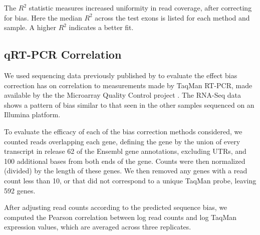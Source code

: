 \documentclass{bioinfo}
\begin{document}
\begin{table}
{
    The $R^2$ statistic measures increased uniformity in read coverage, after
    correcting for bias.  Here the median $R^2$ across the test exons is listed
    for each method and sample. A higher $R^2$ indicates a better fit.
}
\end{table}


\subsection{qRT-PCR Correlation}

We used sequencing data previously published by \citet{Au2010} to evaluate the
effect bias correction has on correlation to measurements made by TaqMan RT-PCR,
made available by the the Microarray Quality Control project \cite{Shi2006}. The
RNA-Seq data shows a pattern of bias similar to that seen in the other samples
sequenced on an Illumina platform.

To evaluate the efficacy of each of the bias correction methods considered, we
counted reads overlapping each gene, defining the gene by the union of every
transcript in release 62 of the Ensembl gene annotations, excluding UTRs, and
100 additional bases from both ends of the gene. Counts were then normalized
(divided) by the length of these genes. We then removed any genes with a read
count less than 10, or that did not correspond to a unique TaqMan probe, leaving
592 genes.

After adjusting read counts according to the predicted sequence bias, we
computed the Pearson correlation between log read counts and log TaqMan
expression values, which are averaged across three replicates.
\end{document}

